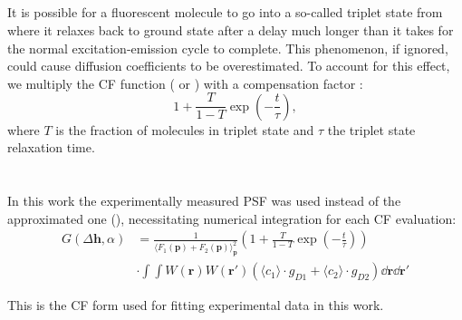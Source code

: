 \subsection{}
It is possible for a fluorescent molecule to go into a so-called triplet
state from where it relaxes back to ground state after a delay much
longer than it takes for the normal excitation-emission cycle to
complete. This phenomenon, if ignored, could cause diffusion coefficients to be
overestimated. To account for this effect, we multiply the \ac{CF} function
(\Eq{~\ref{eq:G_alpha}} or \Eq{~\ref{eq:G_2c}} )
with a compensation factor
\citep{Widengren_95_JPhysChem_99_p13368,Krichevsky_02_ReportsonProgPhys_65_p251,Haustein_07_AnnuRevBiophysBiomolStruct_36_p151,Groner_10_OptExpress_18_p21225} :
\begin{equation}
  1+\frac{T}{1-T}\exp\left(-\frac{t}{\tau}\right),
\end{equation}
where $T$ is the fraction of molecules in triplet state and $\tau$ the
triplet state relaxation time. 


\section{}
In this work the experimentally measured 
\ac{PSF} was used instead of the approximated one (\Eq{~\ref{eq:PSF_def}}), necessitating numerical integration for
each \ac{CF} evaluation:
\begin{align}
G(\Delta \mathbf{h},\alpha)&=\frac{1}{\langle
F_1(\mathbf{p})+F_2(\mathbf{p})\rangle_{\mathbf{p}}^2}
\left(
1+\frac{T}{1-T}\exp\left(-\frac{t}{\tau}\right)
\right)
\nonumber\\
&\cdot\int\!\!\int
W(\mathbf{r})W(\mathbf{r'})
\left(
\langle c_1 \rangle \cdot g_{D1}
+
\langle c_2 \rangle \cdot g_{D2}
\right)
\dd \mathbf{r}\dd \mathbf{r'}
\label {eq:G_2ctrip}
\end{align}

This is the \ac{CF} form used for fitting experimental data in this work.
